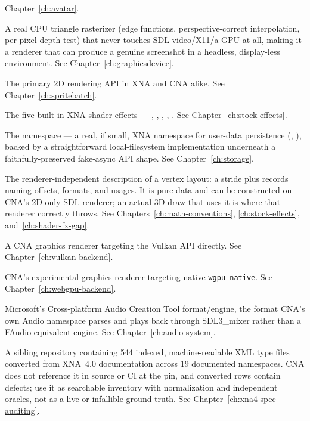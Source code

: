 \begin{description}
  Chapter~\ref{ch:avatar}.
\item[SOFTWARE] A real CPU triangle rasterizer (edge
  functions, perspective-correct interpolation, per-pixel depth test) that never touches SDL
  video/X11/a GPU at all, making it a renderer that can produce a genuine screenshot in a
  headless, display-less environment. See
  Chapter~\ref{ch:graphicsdevice}.
\item[SpriteBatch] The primary 2D rendering API in XNA and CNA alike. See Chapter~\ref{ch:spritebatch}.
\item[Stock effects] The five built-in XNA shader effects --- ,
  , , ,
  . See Chapter~\ref{ch:stock-effects}.
\item[Storage] The  namespace --- a real, if
  small, XNA namespace for user-data persistence (,
  ), backed by a straightforward local-filesystem implementation
  underneath a faithfully-preserved fake-async API shape. See Chapter~\ref{ch:storage}.
\item[VertexDeclaration] The renderer-independent description of a vertex layout: a stride plus
   records naming offsets, formats, and usages. It is pure data and can
  be constructed on CNA's 2D-only SDL renderer; an actual 3D draw that uses it is where
  that renderer correctly throws. See Chapters~\ref{ch:math-conventions},
  \ref{ch:stock-effects}, and~\ref{ch:shader-fx-gap}.
\item[VULKAN] A CNA graphics renderer targeting the Vulkan API directly. See
  Chapter~\ref{ch:vulkan-backend}.
\item[WEBGPU] CNA's experimental graphics renderer targeting native \texttt{wgpu-native}.
  See Chapter~\ref{ch:webgpu-backend}.
\item[XACT] Microsoft's Cross-platform Audio Creation Tool format/engine, the format CNA's own
  Audio namespace parses and plays back through SDL3\_mixer rather than a FAudio-equivalent
  engine. See Chapter~\ref{ch:audio-system}.
\item[xna4-spec] A sibling repository containing 544 indexed, machine-readable XML type files
  converted from XNA~4.0 documentation across 19 documented namespaces. CNA does not reference it
  in source or CI at the pin, and converted rows contain defects; use it as searchable inventory
  with normalization and independent oracles, not as a live or infallible ground truth. See
  Chapter~\ref{ch:xna4-spec-auditing}.
\end{description}

